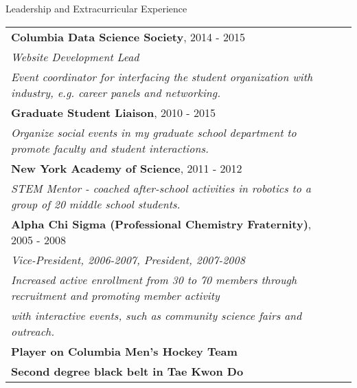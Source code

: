 \documentclass{resume} %
\begin{document}
\begin{rSection}{Leadership and Extracurricular Experience}

\begin{tabular}{ @{} >{}l @{\hspace{6ex}} l }

{\bf Columbia Data Science Society}, 2014 - 2015 \\
{\em Website Development Lead}\\
{\em Event coordinator for interfacing the student organization with industry, e.g. career panels and networking.}\\
{\bf Graduate Student Liaison}, 2010 - 2015 \\
{\em Organize social events in my graduate school department to promote faculty and student interactions.} \\
{\bf New York Academy of Science}, 2011 - 2012 \\
{\em STEM Mentor - coached after-school activities in robotics to a group of 20 middle school students.}\\
{\bf Alpha Chi Sigma (Professional Chemistry Fraternity)}, 2005 - 2008 \\
{\em Vice-President, 2006-2007, President, 2007-2008}\\
{\em Increased active enrollment from 30 to 70 members through recruitment and promoting member activity}\\ {\em with interactive events, such as community science fairs and outreach.}\\
{\bf Player on Columbia Men's Hockey Team} \\
{\bf Second degree black belt in Tae Kwon Do}

\end{tabular}

%
%

\end{rSection}
\end{document}
